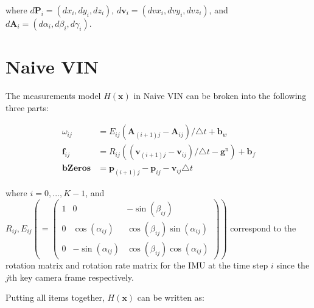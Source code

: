\documentclass[12pt]{article}   %
\begin{document}
\begin{appendices}
where $d\textbf{P}_{i} = (dx_{i}, dy_{i}, dz_{i}) $,
$d\textbf{v}_{i} = (dvx_{i}, dvy_{i}, dvz_{i}) $, and
$d\textbf{A}_{i} = (d\alpha_{i}, d\beta_{i}, d\gamma_{i}) $.

\section{Naive VIN}
\label{apn:naiveVin}
The measurements model $H(\textbf{x})$ in Naive VIN can be broken into the following three parts:

\begin{align}
\omega_{ij} &= E_{ij} (\textbf{A}_{(i+1)j} - \textbf{A}_{ij})/\triangle t + \textbf{b}_w \\
\textbf{f}_{ij} &= R_{ij} ((\textbf{v}_{(i+1)j} - \textbf{v}_{ij}) / \triangle t - \textbf{g}^{\mathrm{n}}) + \textbf{b}_f \\
\textbf{bZeros} &= \textbf{p}_{(i+1)j} - \textbf{p}_{ij} - \textbf{v}_{ij} \triangle t
\end{align}

where $i = 0,..., K-1$, and $R_{ij}, E_{ij} ( = \begin{pmatrix} 1 & 0 & -\sin(\beta_{ij}) \\ 0 & \cos(\alpha_{ij}) & \cos(\beta_{ij})\sin(\alpha_{ij}) \\ 0 & -\sin(\alpha_{ij}) & \cos(\beta_{ij})\cos(\alpha_{ij}) \end{pmatrix}) $ correspond to the rotation matrix and rotation rate matrix for the IMU at the time step $i$ since the $j$th key camera frame respectively.

Putting all items together, $H(\textbf{x})$ can be written as:


\end{appendices}
\end{document}
